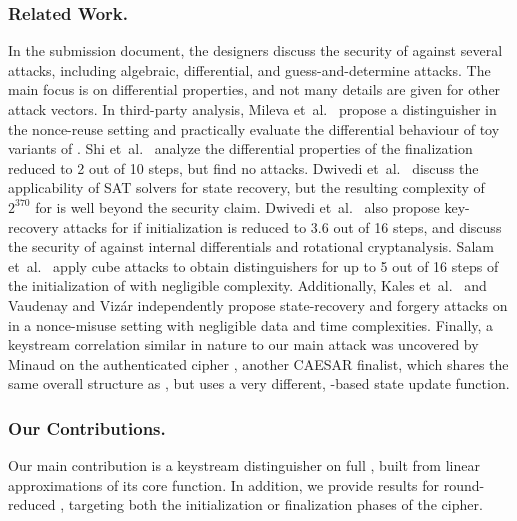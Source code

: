\subsubsection*{Related Work.}
In the \MORUS submission document, the designers discuss the security of \MORUS against
several attacks, including algebraic, differential, and guess-and-determine attacks.
The main focus is on differential properties, and not many details are given for other attack vectors.
In third-party analysis,
Mileva et~al.~\cite{balkancryptsecMilevaDV15} propose a distinguisher in the nonce-reuse setting and practically evaluate the differential behaviour of toy variants of \MORUS.
Shi et~al.~\cite{aiieShiGLZ16} analyze the differential properties of the finalization reduced to 2 out of 10 steps, but find no attacks.
Dwivedi et~al.~\cite{cryptoeprint:2016:1053} discuss the applicability of SAT solvers for state recovery, but the resulting complexity of $2^{370}$ for \MORUS[640] is well beyond the security claim.
Dwivedi et~al.~\cite{secryptDwivediMW17} also propose key-recovery attacks for \MORUS[1280] if initialization is reduced to 3.6 out of 16 steps, and discuss the security of \MORUS against internal differentials and rotational cryptanalysis.
Salam et~al.~\cite{trustcomSalamSBDPW17} apply cube attacks to obtain distinguishers for up to 5 out of 16 steps of the initialization of \MORUS[1280] with negligible complexity.
Additionally, 
Kales et~al.~\cite{cryptoeprint:2017:1137} and
Vaudenay and Viz\'{a}r \cite{cryptoeprint:2017:1147}
independently propose state-recovery and forgery attacks on \MORUS in a nonce-misuse setting with negligible data and time complexities.
Finally, a keystream correlation similar in nature to our main attack was uncovered by Minaud \cite{sacryptMinaud14} on the authenticated cipher  \cite{AEGIS,sacryptWuP13}, another CAESAR finalist, which shares the same overall structure as \MORUS, but uses a very different, -based state update function.

\subsubsection*{Our Contributions.}
Our main contribution is a keystream distinguisher on full \MORUS[1280], built from linear approximations of its core \StateUpdate{} function.
In addition, we provide results for round-reduced \MORUS, targeting both the initialization or finalization phases of the cipher.


